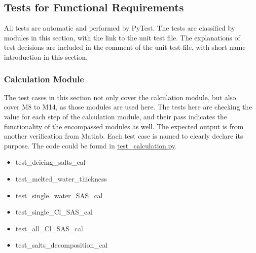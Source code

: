 \documentclass[12pt, titlepage]{article}
\begin{document}

\subsection{Tests for Functional Requirements}
All tests are automatic and performed by PyTest. The tests are classified by modules in this section, with the link to the unit test file. The explanations of test decisions are included in the comment of the unit test file, with short name introduction in this section.


\subsubsection{Calculation Module} \label{CM}
The test cases in this section not only cover the calculation module, but also cover M8 to M14, as those modules are used here. The tests here are checking the value for each step of the calculation module, and their pass indicates the functionality of the encompassed modules as well. The expected output is from another verification from Matlab. Each test case is named to clearly declare its purpose. The code could be found in \href{https://github.com/CynthiaLiu0805/BridgeCorrosion/blob/main/src/database/test_calculation.py}{test\_calculation.py}.
\begin{itemize}
\item test\_deicing\_salts\_cal
\item test\_melted\_water\_thickness
\item test\_single\_water\_SAS\_cal
\item test\_single\_Cl\_SAS\_cal
\item test\_all\_Cl\_SAS\_cal
\item test\_salts\_decomposition\_cal
\end{itemize}
\end{document}
